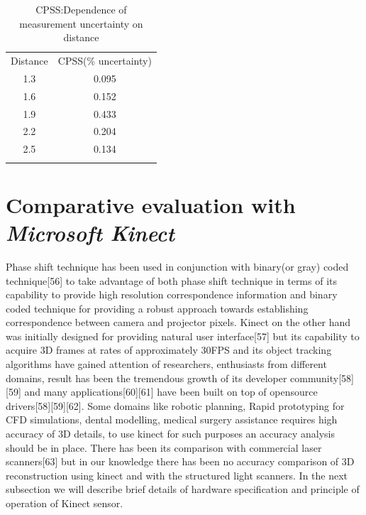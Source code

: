 \begin{table}[ht]
\centering
\label{table:uncertainty}
\begin{tabular}{c c}
\hline\noalign{\smallskip}
Distance  & CPSS(\% uncertainty) \\
\noalign{\smallskip}\hline\noalign{\smallskip}
1.3  & 0.095  \\
1.6  & 0.152   \\
1.9  & 0.433   \\
2.2 & 0.204  \\
2.5  & 0.134 \\
\noalign{\smallskip}\hline
\end{tabular}
\caption{CPSS:Dependence of measurement uncertainty on distance}
\end{table}





\section{Comparative evaluation with \textit{Microsoft Kinect}}
Phase shift technique has been used in conjunction with binary(or gray) coded technique[56] to take advantage of both phase shift technique in terms of its capability to provide high resolution correspondence information and binary coded technique for providing a robust approach towards establishing correspondence between camera and projector pixels. Kinect on the other hand was initially designed for providing natural user interface[57] but its capability to acquire 3D frames at rates of approximately 30FPS and its object tracking algorithms have gained attention of researchers, enthusiasts from different domains, result has been the tremendous growth of its developer community[58][59] and many applications[60][61] have been built on top of opensource drivers[58][59][62]. Some domains like robotic planning, Rapid prototyping for CFD simulations, dental modelling, medical surgery assistance requires high accuracy of 3D details, to use kinect for such purposes an accuracy analysis should be in place. There has been its comparison with commercial laser scanners[63] but in our knowledge there has been no accuracy comparison of 3D reconstruction using kinect and with the structured light scanners. In the next subsection we will describe brief details of hardware specification and principle of operation of Kinect sensor.

